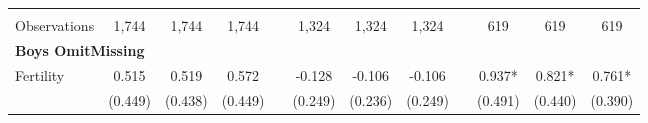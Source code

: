 \begin{landscape}
\begin{table}[htpb!]
\begin{center}
\begin{tabular}{lcccp{2mm}cccp{2mm}ccc}
\begin{footnotesize}\end{footnotesize}&\begin{footnotesize}\end{footnotesize}&\begin{footnotesize}\end{footnotesize}&\begin{footnotesize}\end{footnotesize}&\begin{footnotesize}\end{footnotesize}&\begin{footnotesize}\end{footnotesize}&\begin{footnotesize}\end{footnotesize}&\begin{footnotesize}\end{footnotesize}&\begin{footnotesize}\end{footnotesize}&\begin{footnotesize}\end{footnotesize}&\begin{footnotesize}\end{footnotesize}&\begin{footnotesize}\end{footnotesize}\\Observations&1,744&1,744&1,744&&1,324&1,324&1,324&&619&619&619\\
\multicolumn{12}{l}{\textbf{Boys OmitMissing}}\\ 
Fertility&0.515&0.519&0.572&&-0.128&-0.106&-0.106&&0.937*&0.821*&0.761*\\
&(0.449)&(0.438)&(0.449)&&(0.249)&(0.236)&(0.249)&&(0.491)&(0.440)&(0.390)\\

\end{tabular}
\end{center}
\end{table}
\end{landscape}
